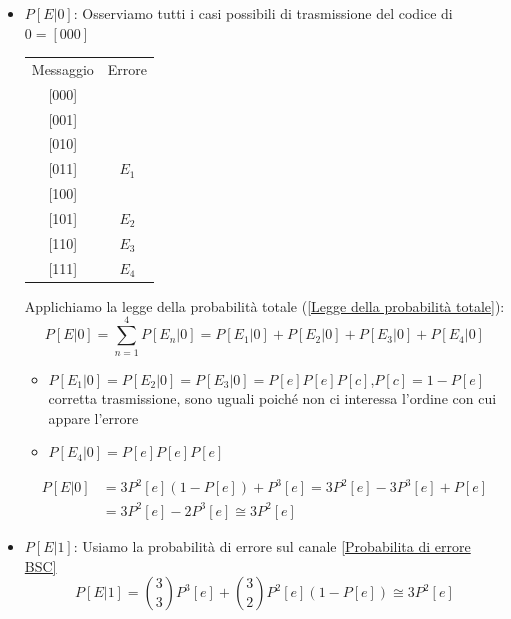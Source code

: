                 \begin{itemize}
                    \item {$P[E|0]$: Osserviamo tutti i casi possibili di trasmissione del codice di $0 = [000]$
                        \begin{table}[H]
                            \centering
                            \begin{tabular}{cc}
                            Messaggio & Errore \\
                            {[}000{]} &    \\
                            {[}001{]} &    \\
                            {[}010{]} &    \\
                            {[}011{]} &    $E_1$\\
                            {[}100{]} &    \\
                            {[}101{]} &    $E_2$\\
                            {[}110{]} &    $E_3$\\
                            {[}111{]} &    $E_4$
                            \end{tabular}
                        \end{table}
                        Applichiamo la legge della probabilità totale (\ref{Legge della probabilità totale}):
                        \[
                            P[E|0] = \sum_{n=1}^{4}P[E_n|0] = P[E_1|0] +P[E_2|0]+P[E_3|0]+P[E_4|0] 
                        \]
                        \begin{itemize}
                            \item {$P[E_1|0] = P[E_2|0] = P[E_3|0] = P[e]P[e]P[c]$,$P[c] = 1-P[e]$ corretta trasmissione, sono uguali poiché non ci interessa l'ordine con cui appare l'errore}
                            \item {$P[E_4|0] = P[e]P[e]P[e]$}
                        \end{itemize}
                        \begin{align}
                            P[E|0] &= 3P^2[e](1-P[e])+ P^3[e] = 3P^2[e]-3P^3[e]+P[e] \nonumber \\
                                   &= 3P^2[e] -2P^3[e] \cong 3P^2[e]\nonumber
                        \end{align}
                    }
                    \item {$P[E|1]$: Usiamo la probabilità di errore sul canale \ref{Probabilita di errore BSC}
                        \[
                            P[E|1] = \binom{3}{3}P^3[e] +\binom{3}{2}P^2[e] (1-P[e]) \cong 3 P^2[e]
                        \]
                    }
                \end{itemize}         

